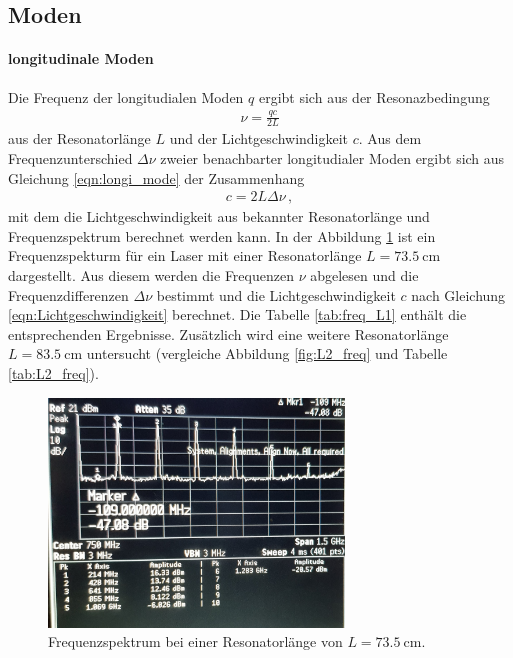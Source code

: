 \subsection{Moden}
\label{subsec:tem}
\paragraph{longitudinale Moden}
Die Frequenz der longitudialen Moden $q$
ergibt sich aus der Resonazbedingung
\begin{align}
  \label{eqn:longi_mode}
  \nu=\frac{qc}{2L}
\end{align}
aus der Resonatorlänge $L$ und der Lichtgeschwindigkeit $c$.
Aus dem Frequenzunterschied $\Delta \nu$ zweier benachbarter longitudialer Moden
ergibt sich aus Gleichung \ref{eqn:longi_mode} der Zusammenhang
\begin{align}
  c = 2L\Delta \nu \, ,  \label{eqn:Lichtgeschwindigkeit}
\end{align}
mit dem die Lichtgeschwindigkeit aus bekannter Resonatorlänge und Frequenzspektrum
berechnet werden kann.
In der Abbildung \ref{fig:L1_freq} ist ein Frequenzspekturm für ein Laser mit einer Resonatorlänge $L=\SI{73.5}{\centi\meter}$
dargestellt. Aus diesem werden die Frequenzen $\nu$ abgelesen
 und die Frequenzdifferenzen $\Delta \nu $ bestimmt und die Lichtgeschwindigkeit $c$ nach Gleichung \ref{eqn:Lichtgeschwindigkeit}
berechnet.
Die Tabelle \ref{tab:freq_L1} enthält die entsprechenden Ergebnisse.
Zusätzlich wird eine weitere Resonatorlänge $L = \SI{83.5}{\centi\meter}$  untersucht
(vergleiche Abbildung \ref{fig:L2_freq} und Tabelle \ref{tab:L2_freq}).

\begin{figure}
\centering
  \includegraphics[width=0.7\textwidth]{pictures/freq_1.jpg}
  \caption{Frequenzspektrum bei einer Resonatorlänge von $L=\SI{73.5}{\centi\meter}$.}
  \label{fig:L1_freq}
\end{figure}

